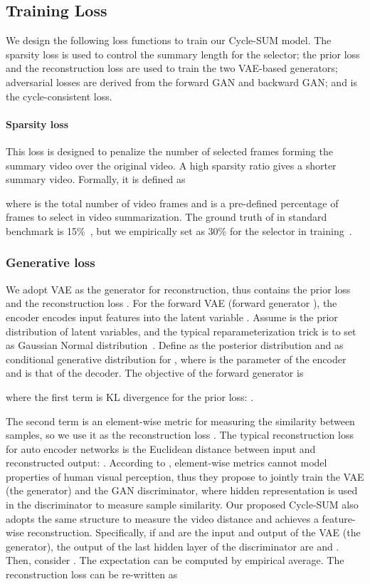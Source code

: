 \documentclass[letterpaper]{article} \usepackage{aaai19}  \usepackage{times}  \usepackage{helvet}  \usepackage{courier}  \usepackage{url}  \usepackage{graphicx}  \frenchspacing  \setlength{\pdfpagewidth}{8.5in}  \setlength{\pdfpageheight}{11in}  \usepackage{amsmath}
\begin{document}
\subsection{Training Loss}
We design the following loss functions to train our Cycle-SUM model. The sparsity loss  is used to control the summary length for the selector; the prior loss  and the reconstruction loss  are used to train the two VAE-based generators; adversarial losses  are derived from the forward GAN and backward GAN; and  is the cycle-consistent loss.

\paragraph{{Sparsity loss} }

This loss is designed to penalize the number of selected frames forming the summary video over the original video. A high sparsity ratio gives a shorter summary video.  Formally, it is defined as

where  is the total number of video frames and  is a pre-defined percentage of frames to select in video summarization. The ground truth of  in standard benchmark is 15\%~\cite{gygli2014creating,song2015tvsum}, but we empirically set  as 30\% for the selector in training~\cite{mahasseni2017unsupervised}.


\subsubsection{\textbf{Generative loss }}
We adopt VAE as the generator for reconstruction, thus  contains the prior loss  and the reconstruction loss . For the forward VAE (forward generator ), the encoder encodes input features  into the latent variable . Assume  is the prior distribution of latent variables, and the typical reparameterization trick is to set  as Gaussian Normal distribution~\cite{kingma2013auto}. Define  as the posterior distribution and  as conditional generative distribution for
, where  is the parameter of the encoder and  is that of the decoder. The objective of the forward generator is

where the first  term is KL divergence for the prior loss:
.


The second  term is an element-wise metric for measuring the similarity between samples, so we use it as the reconstruction loss .
The typical reconstruction loss for auto encoder networks is  the Euclidean distance between input and reconstructed output: . According to \cite{larsen2015autoencoding}, element-wise metrics cannot model properties of human visual perception, thus they propose to jointly train the VAE (the generator) and the GAN discriminator, where hidden representation is used in the discriminator to measure sample similarity. Our proposed Cycle-SUM also adopts the same structure to measure the video distance and achieves a feature-wise reconstruction. Specifically, if  and  are the input and output of the VAE (the generator), the output of the last hidden layer of the discriminator are  and . Then, consider . The expectation  can be computed by empirical average. The reconstruction loss can be re-written as
\end{document}

